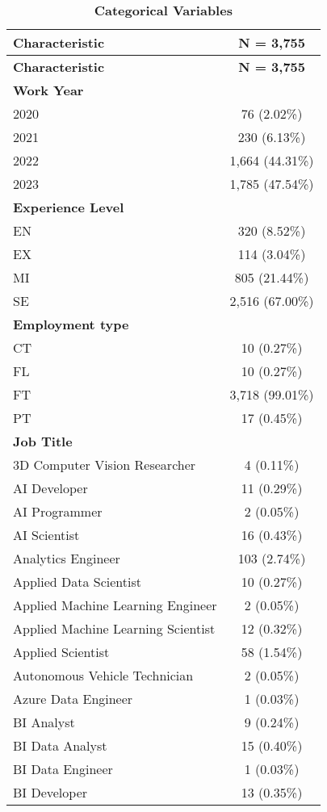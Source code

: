 \documentclass[
]{article}
\begin{document}
\begin{longtable}[]{@{}lc@{}}
\caption{\textbf{Categorical Variables}}\tabularnewline
\toprule\noalign{}
\textbf{Characteristic} & \textbf{N = 3,755} \\
\midrule\noalign{}
\endfirsthead
\toprule\noalign{}
\textbf{Characteristic} & \textbf{N = 3,755} \\
\midrule\noalign{}
\endhead
\bottomrule\noalign{}
\endlastfoot
\textbf{Work Year} & \\
2020 & 76 (2.02\%) \\
2021 & 230 (6.13\%) \\
2022 & 1,664 (44.31\%) \\
2023 & 1,785 (47.54\%) \\
\textbf{Experience Level} & \\
EN & 320 (8.52\%) \\
EX & 114 (3.04\%) \\
MI & 805 (21.44\%) \\
SE & 2,516 (67.00\%) \\
\textbf{Employment type} & \\
CT & 10 (0.27\%) \\
FL & 10 (0.27\%) \\
FT & 3,718 (99.01\%) \\
PT & 17 (0.45\%) \\
\textbf{Job Title} & \\
3D Computer Vision Researcher & 4 (0.11\%) \\
AI Developer & 11 (0.29\%) \\
AI Programmer & 2 (0.05\%) \\
AI Scientist & 16 (0.43\%) \\
Analytics Engineer & 103 (2.74\%) \\
Applied Data Scientist & 10 (0.27\%) \\
Applied Machine Learning Engineer & 2 (0.05\%) \\
Applied Machine Learning Scientist & 12 (0.32\%) \\
Applied Scientist & 58 (1.54\%) \\
Autonomous Vehicle Technician & 2 (0.05\%) \\
Azure Data Engineer & 1 (0.03\%) \\
BI Analyst & 9 (0.24\%) \\
BI Data Analyst & 15 (0.40\%) \\
BI Data Engineer & 1 (0.03\%) \\
BI Developer & 13 (0.35\%) \\

\end{longtable}
\end{document}
